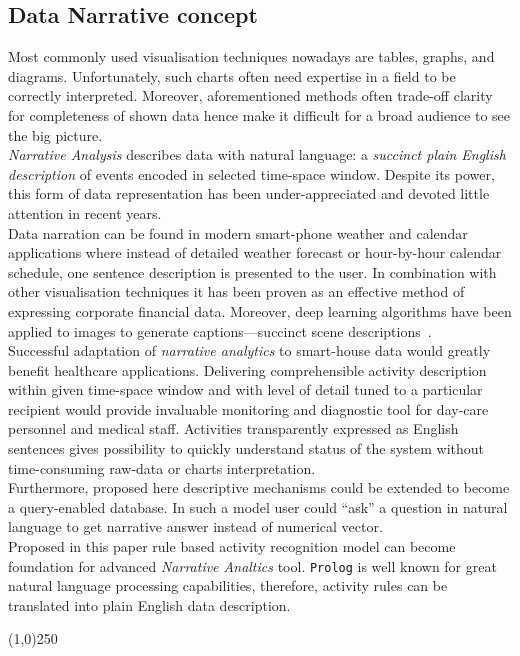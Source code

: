 \documentclass[11pt, a4paper, pdflatex, leqno, twoside, openright]{report}
\begin{document}
    \subsection{Data Narrative concept\label{sec:narrative}}
Most commonly used visualisation techniques nowadays are tables, graphs, and diagrams. Unfortunately, such charts often need expertise in a field to be correctly interpreted. Moreover, aforementioned methods often trade-off clarity for completeness of shown data hence make it difficult for a broad audience to see the big picture.\\

\emph{Narrative Analysis} describes data with natural language: a \emph{succinct plain English description} of events encoded in selected time-space window. Despite its power, this form of data representation has been under-appreciated and devoted little attention in recent years.\\
Data narration can be found in modern smart-phone weather and calendar applications where instead of detailed weather forecast or hour-by-hour calendar schedule, one sentence description is presented to the user. In combination with other visualisation techniques it has been proven as an effective method of expressing corporate financial data. Moreover, deep learning algorithms have been applied to images to generate captions---succinct scene descriptions~\citep{vinyals2014show}.\\

Successful adaptation of \emph{narrative analytics} to smart-house data would greatly benefit healthcare applications. Delivering comprehensible activity description within given time-space window and with level of detail tuned to a particular recipient would provide invaluable monitoring and diagnostic tool for day-care personnel and medical staff. Activities transparently expressed as English sentences gives possibility to quickly understand status of the system without time-consuming raw-data or charts interpretation.\\
Furthermore, proposed here descriptive mechanisms could be extended to become a query-enabled database. In such a model user could ``ask'' a question in natural language to get narrative answer instead of numerical vector.\\

Proposed in this paper rule based activity recognition model can become foundation for advanced \emph{Narrative Analtics} tool. \texttt{Prolog} is well known for great natural language processing capabilities, therefore, activity rules can be translated into plain English data description.

\begin{center}
\noindent \line(1,0){250}
\end{center}

{}

% 
\end{document}

